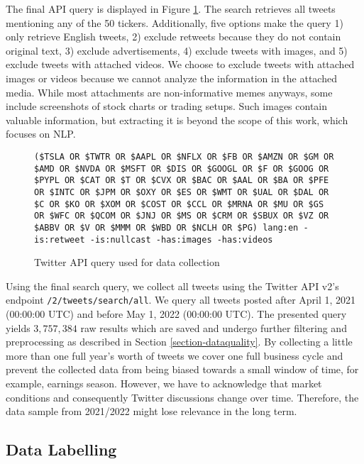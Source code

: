 The final API query is displayed in Figure \ref{figure-api-query}. The search retrieves all tweets mentioning any of the 50 tickers. Additionally, five options make the query 1) only retrieve English tweets, 2) exclude retweets because they do not contain original text, 3) exclude advertisements, 4) exclude tweets with images, and 5) exclude tweets with attached videos. We choose to exclude tweets with attached images or videos because we cannot analyze the information in the attached media. While most attachments are non-informative memes anyways, some include screenshots of stock charts or trading setups. Such images contain valuable information, but extracting it is beyond the scope of this work, which focuses on NLP.

\begin{figure}[!ht]
	\begin{tcolorbox}
	\small
	\centering
\texttt{(\$TSLA OR \$TWTR OR \$AAPL OR \$NFLX OR \$FB OR \$AMZN OR \$GM OR \$AMD OR \$NVDA OR \$MSFT OR \$DIS OR \$GOOGL OR \$F OR \$GOOG OR \$PYPL OR \$CAT OR \$T OR \$CVX OR \$BAC OR \$AAL OR \$BA OR \$PFE OR \$INTC OR \$JPM OR \$OXY OR \$ES OR \$WMT OR \$UAL OR \$DAL OR \$C OR \$KO OR \$XOM OR \$COST OR \$CCL OR \$MRNA OR \$MU OR \$GS OR \$WFC OR \$QCOM OR \$JNJ OR \$MS OR \$CRM OR \$SBUX OR \$VZ OR \$ABBV OR \$V OR \$MMM OR \$WBD OR \$NCLH OR \$PG) lang:en -is:retweet -is:nullcast -has:images -has:videos}
	\end{tcolorbox}
	\caption{Twitter API query used for data collection}
	\label{figure-api-query}
\end{figure}

Using the final search query, we collect all tweets using the Twitter API v2's endpoint \texttt{/2/tweets/search/all}. We query all tweets posted after April 1, 2021 (00:00:00 UTC) and before May 1, 2022 (00:00:00 UTC). The presented query yields $3,757,384$ raw results which are saved and undergo further filtering and preprocessing as described in Section \ref{section-dataquality}. 
 By collecting a little more than one full year's worth of tweets we cover one full business cycle and prevent the collected data from being biased towards a small window of time, for example, earnings season. However, we have to acknowledge that market conditions and consequently Twitter discussions change over time. Therefore, the data sample from 2021/2022 might lose relevance in the long term.


\subsection{Data Labelling}

